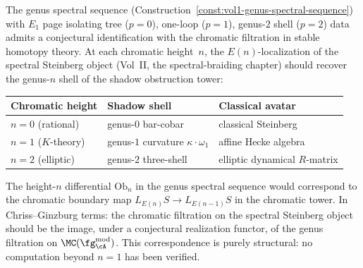 \begin{remark}
\label{rem:chromatic-shadow-correspondence}
\ClaimStatusConjectured
{}
The genus spectral sequence (Construction~\ref{const:vol1-genus-spectral-sequence}) with $E_1$ page isolating tree ($p=0$), one-loop ($p=1$), genus-$2$ shell ($p=2$) data admits a conjectural identification with the chromatic filtration in stable homotopy theory. At each chromatic height~$n$, the $E(n)$-localization of the spectral Steinberg object (Vol~II, the spectral-braiding chapter) should recover the genus-$n$ shell of the shadow obstruction tower:
\begin{center}
\renewcommand{\arraystretch}{1.2}
\begin{tabular}{lll}
\textbf{Chromatic height} & \textbf{Shadow shell} & \textbf{Classical avatar} \\
\hline
$n = 0$ (rational) & genus-$0$ bar-cobar & classical Steinberg \\
$n = 1$ ($K$-theory) & genus-$1$ curvature $\kappa \cdot \omega_1$ & affine Hecke algebra \\
$n = 2$ (elliptic) & genus-$2$ three-shell & elliptic dynamical $R$-matrix
\end{tabular}
\end{center}
The height-$n$ differential $\mathrm{Ob}_n$ in the genus spectral sequence would correspond to the chromatic boundary map $L_{E(n)}S \to L_{E(n-1)}S$ in the chromatic tower. In Chriss--Ginzburg terms: the chromatic filtration on the spectral Steinberg object should be the image, under a conjectural realization functor, of the genus filtration on $\MC(\fg^{\mathrm{mod}}_\cA)$. This correspondence is purely structural: no computation beyond $n = 1$ has been verified.
\end{remark}

